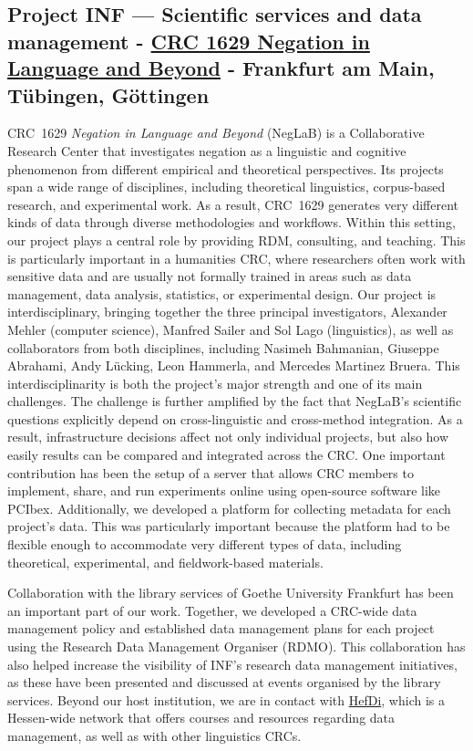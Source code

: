 \documentclass{eceasst}
\begin{document}
\subsection{Project INF --- Scientific services and data management - \href{https://gepris.dfg.de/gepris/projekt/537324246?language=en}{CRC 1629 Negation in Language and Beyond} - Frankfurt am Main, Tübingen, Göttingen}
CRC~1629 \emph{Negation in Language and Beyond} (NegLaB) is a Collaborative Research Center that investigates negation as a linguistic and cognitive phenomenon from different empirical and theoretical perspectives.
Its projects span a wide range of disciplines, including theoretical linguistics, corpus-based research, and experimental work. As a result, CRC~1629 generates very different kinds of data through diverse methodologies and workflows. Within this setting, our project plays a central role by providing RDM, consulting, and teaching. This is particularly important in a humanities CRC, where researchers often work with sensitive data and are usually not formally trained in areas such as data management, data analysis, statistics, or experimental design.
Our project is interdisciplinary, bringing together the three principal investigators, Alexander Mehler (computer science),
Manfred Sailer and Sol Lago (linguistics), as well as collaborators from both disciplines,
including Nasimeh Bahmanian, Giuseppe Abrahami, Andy Lücking, Leon Hammerla, and Mercedes Martinez Bruera.
This interdisciplinarity is both the project’s major strength and one of its main challenges.
The challenge is further amplified by the fact that NegLaB’s scientific questions explicitly depend on cross-linguistic and cross-method integration.
As a result, infrastructure decisions affect not only individual projects, but also how easily results can be compared and integrated across the CRC.
One important contribution has been the setup of a server that allows CRC members to implement,
share, and run experiments online using open-source software like PCIbex\cite{zehr_schwarz_2018_pcibex}.
Additionally, we developed a platform for collecting metadata for each project’s data.
This was particularly important because the platform had to be flexible enough to accommodate very different types of data,
including theoretical, experimental, and fieldwork-based materials.

Collaboration with the library services of Goethe University Frankfurt has been an important part of our work.
Together, we developed a CRC-wide data management policy and established data management plans for each project using the Research Data Management Organiser (RDMO).
This collaboration has also helped increase the visibility of INF's research data management initiatives, as these have been presented and discussed at events organised by the library services.
Beyond our host institution, we are in contact with \href{https://www.uni-marburg.de/en/hefdi/about-hefdi}{HefDi},
which is a Hessen-wide network that offers courses and resources regarding data management, as well as with other linguistics CRCs.
\end{document}
